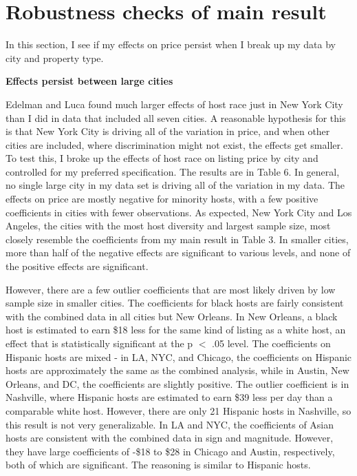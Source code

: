 \section{Robustness checks of main result} %

In this section, I see if my effects on price persist when I break up my data by city and property type. 

\textbf{Effects persist between large cities}

Edelman and Luca found much larger effects of host race just in New York City than I did in data that included all seven cities. A reasonable hypothesis for this is that New York City is driving all of the variation in price, and when other cities are included, where discrimination might not exist, the effects get smaller. To test this, I broke up the effects of host race on listing price by city and controlled for my preferred specification. The results are in Table 6. In general, no single large city in my data set is driving all of the variation in my data. The effects on price are mostly negative for minority hosts, with a few positive coefficients in cities with fewer observations. As expected, New York City and Los Angeles, the cities with the most host diversity and largest sample size, most closely resemble the coefficients from my main result in Table 3. In smaller cities, more than half of the negative effects are significant to various levels, and none of the positive effects are significant. 

However, there are a few outlier coefficients that are most likely driven by low sample size in smaller cities. The coefficients for black hosts are fairly consistent with the combined data in all cities but New Orleans. In New Orleans, a black host is estimated to earn \$18 less for the same kind of listing as a white host, an effect that is statistically significant at the p $<$ .05 level. The coefficients on Hispanic hosts are mixed - in LA, NYC, and Chicago, the coefficients on Hispanic hosts are approximately the same as the combined analysis, while in Austin, New Orleans, and DC, the coefficients are slightly positive. The outlier coefficient is in Nashville, where Hispanic hosts are estimated to earn \$39 less per day than a comparable white host. However, there are only 21 Hispanic hosts in Nashville, so this result is not very generalizable. In LA and NYC, the coefficients of Asian hosts are consistent with the combined data in sign and magnitude. However, they have large coefficients of -\$18 to \$28 in Chicago and Austin, respectively, both of which are significant. The reasoning is similar to Hispanic hosts. 

